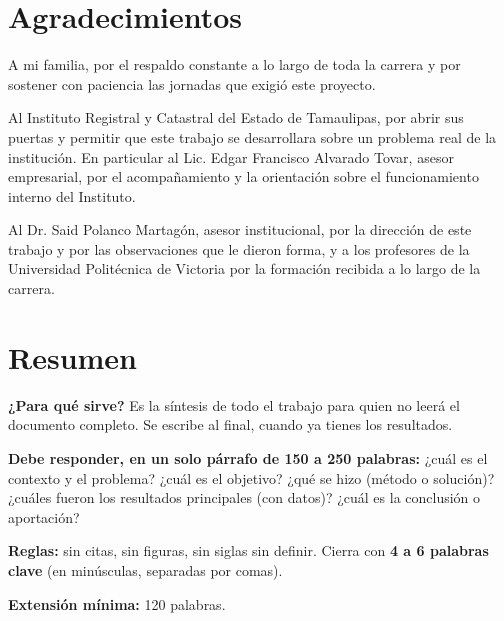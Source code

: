 
\clearpage
\ClearWallPaper
\pagestyle{fancy}

\section*{\centering Agradecimientos}

A mi familia, por el respaldo constante a lo largo de toda la carrera y por sostener con paciencia las jornadas que exigió este proyecto.

Al Instituto Registral y Catastral del Estado de Tamaulipas, por abrir sus puertas y permitir que este trabajo se desarrollara sobre un problema real de la institución. En particular al Lic. Edgar Francisco Alvarado Tovar, asesor empresarial, por el acompañamiento y la orientación sobre el funcionamiento interno del Instituto.

Al Dr. Said Polanco Martagón, asesor institucional, por la dirección de este trabajo y por las observaciones que le dieron forma, y a los profesores de la Universidad Politécnica de Victoria por la formación recibida a lo largo de la carrera.

\clearpage
\section*{\centering Resumen} %

\begin{guia}
\textbf{¿Para qué sirve?} Es la síntesis de todo el trabajo para quien no leerá el documento completo. Se escribe al
final, cuando ya tienes los resultados.

\textbf{Debe responder, en un solo párrafo de 150 a 250 palabras:} ¿cuál es el contexto y el problema? ¿cuál es el
objetivo? ¿qué se hizo (método o solución)? ¿cuáles fueron los resultados principales (con datos)? ¿cuál es la
conclusión o aportación?

\textbf{Reglas:} sin citas, sin figuras, sin siglas sin definir. Cierra con \textbf{4 a 6 palabras clave} (en
minúsculas, separadas por comas).

\textbf{Extensión mínima:} 120 palabras.
\end{guia}

